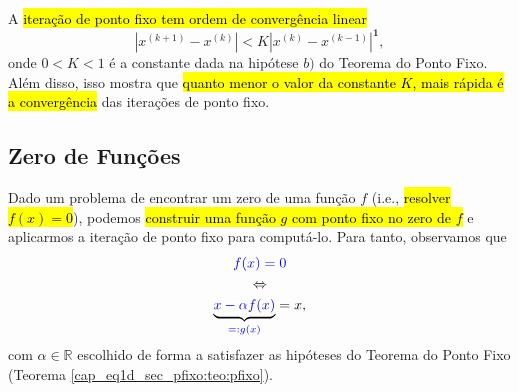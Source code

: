 \begin{obs}
  A \hl{iteração de ponto fixo tem ordem de convergência linear}
  \begin{equation}
    |x^{(k+1)} - x^{(k)}| < K|x^{(k)} - x^{(k-1)}|^{\pmb{1}},
  \end{equation}
onde $0 < K < 1$ é a constante dada na hipótese $b)$ do Teorema do Ponto Fixo. Além disso, isso mostra que \hl{quanto menor o valor da constante $K$, mais rápida é a convergência} das iterações de ponto fixo.
\end{obs}


\subsection{Zero de Funções}

Dado um problema de encontrar um zero de uma função $f$ (i.e., \hl{resolver $f(x)=0$}), podemos \hl{construir uma função $g$ com ponto fixo no zero de $f$} e aplicarmos a iteração de ponto fixo para computá-lo. Para tanto, observamos que
\begin{gather}
  {\color{blue}f(x) = 0} \\
  \Leftrightarrow \\
  \underbrace{{\color{blue}x - \alpha f(x)}}_{\color{blue}=: g(x)} = x,
\end{gather}
com $\alpha\in\mathbb{R}$ escolhido de forma a satisfazer as hipóteses do Teorema do Ponto Fixo (Teorema \ref{cap_eq1d_sec_pfixo:teo:pfixo}).

